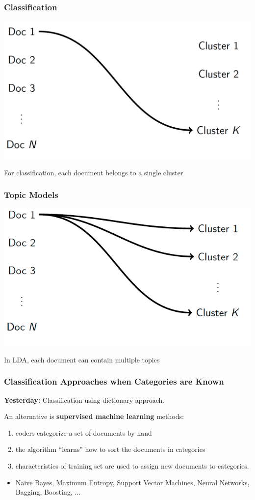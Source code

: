 \documentclass[11pt,compress,professionalfonts]{beamer}
\newcommand{\ita}{\begin{itemize}}
\newcommand{\itm}{\item[]}
\newcommand{\itz}{\end{itemize}}
\begin{document}
\begin{frame}[t,fragile]\frametitle{Classification}
\vspace{10 mm}
\centerline{\includegraphics[scale=.2]{pictures/classification.png}}
\centerline{\normalsize For classification, each document belongs to a single cluster}
\end{frame}

\begin{frame}[t,fragile]\frametitle{Topic Models}
\vspace{10 mm}
\centerline{\includegraphics[scale=.4]{pictures/LDA.png}}
\centerline{\normalsize In LDA, each document can contain multiple topics}
\end{frame}


\begin{frame}[t,fragile]\frametitle{Classification Approaches when Categories are Known}

{\bf Yesterday:} Classification using dictionary approach.

An alternative is \textbf{supervised machine learning} methods:
\begin{enumerate}

\item coders categorize a set of documents by hand
\item the algorithm ``learns'' how to sort the documents in categories
\item  characteristics of training set are used  to assign new documents to categories.
\end{enumerate}
\ita
\itm Naive Bayes, Maximum Entropy, Support Vector Machines, Neural Networks, Bagging, Boosting, $\ldots$
\itz
\end{frame}
\end{document}
